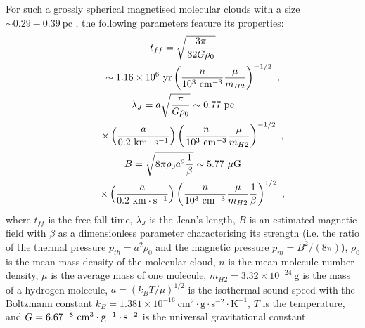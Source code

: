 \documentclass[fleqn,usenatbib]{mnras}
\begin{document}
For such a grossly spherical magnetised molecular clouds with a size $\sim 0.29-0.39~\mathrm{pc}$ \citep{klessen2001formation}, the following parameters feature its properties:
\begin{gather}
t_{ff}=\sqrt{\frac{3\pi}{32G\rho_{0}}}\notag\\
\qquad\sim 1.16\times 10^{6}~\mathrm{yr} \left(\frac{n}{10^{3}~\mathrm{cm^{-3}}}
 \frac{\mu}{m_{H2}}\right)^{-1/2}\ ,\\
\lambda_{J}=a\sqrt{\frac{\pi}{G\rho_{0}}}\sim 0.77~{\rm pc}\notag \\
\qquad\times\left(\frac{a}{0.2~\mathrm{km\cdot s^{-1}}}\right)\left(\frac{n}{10^{3}~\mathrm{cm^{-3}}}
 \frac{\mu}{m_{H2}}\right)^{-1/2}\ ,\\
B=\sqrt{8\pi\rho_{0} a^{2}\frac{1}{\beta}}\sim 5.77~\mathrm{\mu G}\notag \\
\qquad\times\left(\frac{a}{0.2~\mathrm{km\cdot s^{-1}}}\right)\left(\frac{n}{10^{3}~\mathrm{cm^{-3}}}
\frac{\mu}{m_{H2}}\frac{1}{\beta}\right)^{1/2}\ ,\label{e43}
\end{gather}
where $t_{ff}$ is the free-fall time, $\lambda_{J}$ is the Jean's length, $B$ is an estimated magnetic field with $\beta$ as a dimensionless parameter characterising its strength 
(i.e. the ratio of the thermal pressure $p_{th}=a^{2}\rho_{0}$ and the magnetic pressure $p_{m}=B^{2}/(8\pi)$), $\rho_{0}$ is the mean mass density of the molecular cloud, $n$ is the mean molecule number density, $\mu$ is the average mass of one molecule, $m_{H2}=3.32\times 10^{-24}~\mathrm{g}$ is the mass of a hydrogen molecule, $a=\left(k_{B}T/\mu\right)^{1/2}$ is the isothermal sound speed with the Boltzmann constant $k_{B}=1.381\times 10^{-16}~\mathrm{cm^{2}\cdot g\cdot s^{-2}\cdot K^{-1}}$, $T$ is the temperature, and $G=6.67\time 10^{-8}~\mathrm{cm^{3}\cdot g^{-1}\cdot s^{-2}}$ is the universal gravitational constant.
\end{document}
